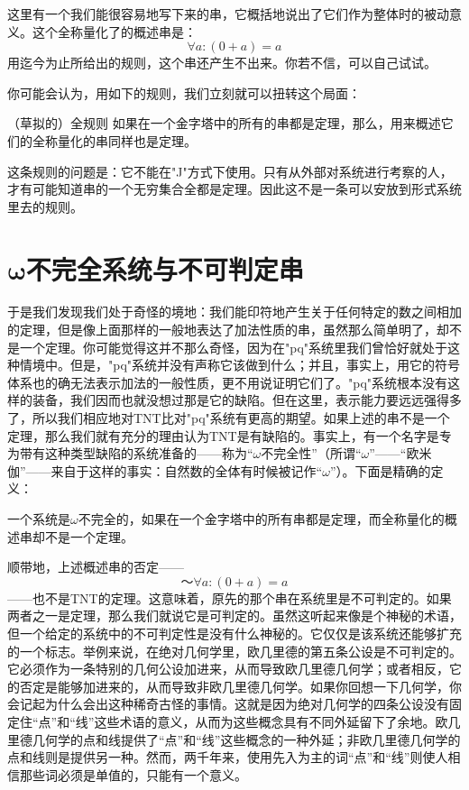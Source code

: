 这里有一个我们能很容易地写下来的串，它概括地说出了它们作为整体时的被动意义。这个全称量化了的概述串是：
\[
\forall a:(0+a)=a
\]
用迄今为止所给出的规则，这个串还产生不出来。你若不信，可以自己试试。

你可能会认为，用如下的规则，我们立刻就可以扭转这个局面：

\begin{thm}[\parindent]{（草拟的）全规则}
如果在一个金字塔中的所有的串都是定理，那么，用来概述它们的全称量化的串同样也是定理。
\end{thm}

这条规则的问题是：它不能在"J"方式下使用。只有从外部对系统进行考察的人，才有可能知道串的一个无穷集合全都是定理。因此这不是一条可以安放到形式系统里去的规则。

\section{\texorpdfstring{$\symbf{\omega}$}{\textomega}不完全系统与不可判定串}

于是我们发现我们处于奇怪的境地：我们能印符地产生关于任何特定的数之间相加的定理，但是像上面那样的一般地表达了加法性质的串，虽然那么简单明了，却不是一个定理。你可能觉得这并不那么奇怪，因为在"pq"系统里我们曾恰好就处于这种情境中。但是，"pq"系统并没有声称它该做到什么；并且，事实上，用它的符号体系也的确无法表示加法的一般性质，更不用说证明它们了。"pq"系统根本没有这样的装备，我们因而也就没想过那是它的缺陷。但在这里，表示能力要远远强得多了，所以我们相应地对TNT比对"pq"系统有更高的期望。如果上述的串不是一个定理，那么我们就有充分的理由认为TNT是有缺陷的。事实上，有一个名字是专为带有这种类型缺陷的系统准备的——称为“$\omega$不完全性”（所谓“$\omega$”——“欧米伽”——来自于这样的事实：自然数的全体有时候被记作“$\omega$”）。下面是精确的定义：

\begin{block}
一个系统是$\omega$不完全的，如果在一个金字塔中的所有串都是定理，而全称量化的概述串却不是一个定理。
\end{block}
顺带地，上述概述串的否定——
\[
～\forall a:(0+a)=a
\]
——也不是TNT的定理。这意味着，原先的那个串在系统里是不可判定的。如果两者之一是定理，那么我们就说它是可判定的。虽然这听起来像是个神秘的术语，但一个给定的系统中的不可判定性是没有什么神秘的。它仅仅是该系统还能够扩充的一个标志。举例来说，在绝对几何学里，欧几里德的第五条公设是不可判定的。它必须作为一条特别的几何公设加进来，从而导致欧几里德几何学；或者相反，它的否定是能够加进来的，从而导致非欧几里德几何学。如果你回想一下几何学，你会记起为什么会出这种稀奇古怪的事情。这就是因为绝对几何学的四条公设没有固定住“点”和“线”这些术语的意义，从而为这些概念具有不同外延留下了余地。欧几里德几何学的点和线提供了“点”和“线”这些概念的一种外延；非欧几里德几何学的点和线则是提供另一种。然而，两千年来，使用先入为主的词“点”和“线”则使人相信那些词必须是单值的，只能有一个意义。

